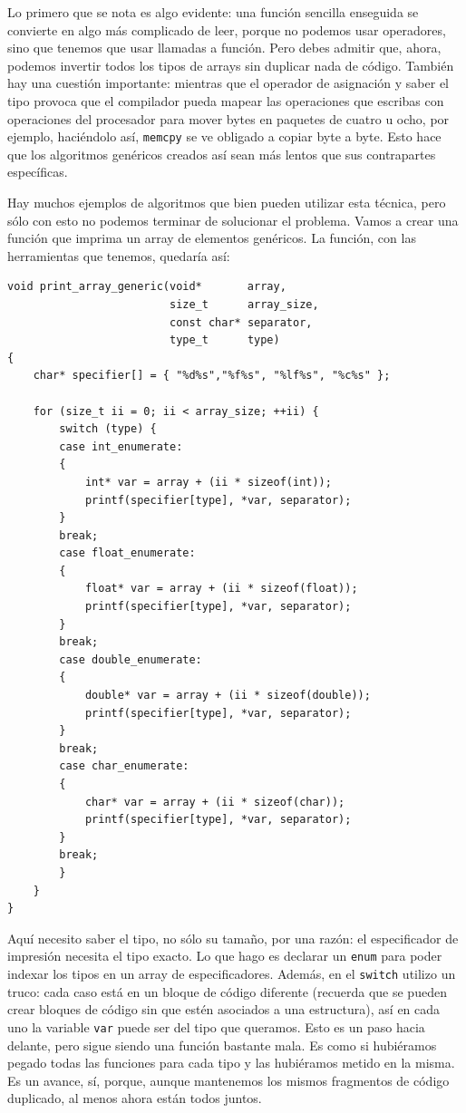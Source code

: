 \documentclass[a4paper]{article}
\begin{document}
Lo primero que se nota es algo evidente: una función sencilla enseguida se
convierte en algo más complicado de leer, porque no podemos usar operadores,
sino que tenemos que usar llamadas a función. Pero debes admitir que, ahora,
podemos invertir todos los tipos de arrays sin duplicar nada de código. También
hay una cuestión importante: mientras que el operador de asignación y saber
el tipo provoca que el compilador pueda mapear las operaciones que escribas con
operaciones del procesador para mover bytes en paquetes de cuatro u ocho, por
ejemplo, haciéndolo así, \verb!memcpy! se ve obligado a copiar byte a byte.
Esto hace que los algoritmos genéricos creados así sean más lentos que sus
contrapartes específicas.

Hay muchos ejemplos de algoritmos que bien pueden utilizar esta técnica, pero
sólo con esto no podemos terminar de solucionar el problema. Vamos a crear
una función que imprima un array de elementos genéricos. La función, con las
herramientas que tenemos, quedaría así:


\noindent
\begin{minipage}[H]{\linewidth}
\mbox{}
\begin{lstlisting}[style=C,
caption={Imprimir arrays de varios tipos},
label={lst:genericPrintf}]
void print_array_generic(void*       array,
                         size_t      array_size,
                         const char* separator,
                         type_t      type)
{
    char* specifier[] = { "%d%s","%f%s", "%lf%s", "%c%s" };

    for (size_t ii = 0; ii < array_size; ++ii) {
        switch (type) {
        case int_enumerate:
        {
            int* var = array + (ii * sizeof(int));
            printf(specifier[type], *var, separator);
        }
        break;
        case float_enumerate:
        {
            float* var = array + (ii * sizeof(float));
            printf(specifier[type], *var, separator);
        }
        break;
        case double_enumerate:
        {
            double* var = array + (ii * sizeof(double));
            printf(specifier[type], *var, separator);
        }
        break;
        case char_enumerate:
        {
            char* var = array + (ii * sizeof(char));
            printf(specifier[type], *var, separator);
        }
        break;
        }
    }
}
\end{lstlisting}
\end{minipage}

Aquí necesito saber el tipo, no sólo su tamaño, por una razón: el especificador
de impresión necesita el tipo exacto. Lo que hago es declarar un \verb!enum!
para poder indexar los tipos en un array de especificadores. Además, en el
\verb!switch! utilizo un truco: cada caso está en un bloque de código diferente
(recuerda que se pueden crear bloques de código sin que estén asociados
a una estructura), así en cada uno la variable \verb!var! puede ser del tipo
que queramos. Esto es un paso hacia delante, pero sigue siendo una función
bastante mala. Es como si hubiéramos pegado todas las funciones para cada tipo
y las hubiéramos metido en la misma. Es un avance, sí, porque, aunque mantenemos
los mismos fragmentos de código duplicado, al menos ahora están todos juntos.
\end{document}
